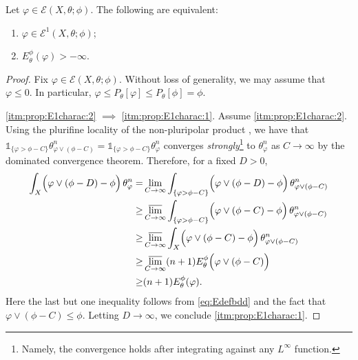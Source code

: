 \begin{proposition}\label{prop:E1charac}
    Let $\varphi\in \mathcal{E}(X,\theta;\phi)$. The following are equivalent:
    \begin{enumerate}
        \item\label{itm:prop:E1charac:1} $\varphi\in \mathcal{E}^1(X,\theta;\phi)$;
        \item\label{itm:prop:E1charac:2} $E^{\phi}_{\theta}(\varphi)>-\infty$.
    \end{enumerate}
\end{proposition}
\begin{proof}
    Fix $\varphi\in \mathcal{E}(X,\theta;\phi)$. Without loss of generality, we may assume that $\varphi\leq 0$. In particular, $\varphi\leq P_{\theta}[\varphi]\leq P_{\theta}[\phi]=\phi$.

    \ref{itm:prop:E1charac:2} $\implies$ \ref{itm:prop:E1charac:1}.
    Assume \ref{itm:prop:E1charac:2}. Using the plurifine locality of the non-pluripolar product , we have that $\mathds{1}_{\{\varphi>\phi-C\}} \theta_{\varphi\lor (\phi-C)}^n=\mathds{1}_{\{\varphi>\phi-C\}} \theta_{\varphi}^n$ converges \emph{strongly}\footnote{Namely, the convergence holds after integrating against any $L^{\infty}$ function.} to $\theta_{\varphi}^n$ as $C\to \infty$ by the dominated convergence theorem. Therefore, for a fixed $D>0$,
    \[
    \begin{aligned}
    \int_X \Bigl( \varphi\lor (\phi-D)-\phi \Bigr)\,\theta_{\varphi}^n=&\lim_{C\to\infty} \int_{\{\varphi>\phi-C\} } \Bigl( \varphi\lor (\phi-D)-\phi \Bigr)\,\theta_{\varphi\lor (\phi-C)}^n\\
    \geq & \varlimsup_{C\to\infty} \int_{\{\varphi>\phi-C\} } \Bigl( \varphi\lor (\phi-C)-\phi \Bigr)\,\theta_{\varphi\lor (\phi-C)}^n\\
    \geq & \varlimsup_{C\to\infty} \int_X \Bigl( \varphi\lor (\phi-C)-\phi \Bigr)\,\theta_{\varphi\lor (\phi-C)}^n\\
    \geq & \varlimsup_{C\to\infty} (n+1)E_{\theta}^{\phi}\Bigl(\varphi \lor (\phi-C) \Bigr)\\
    \geq & (n+1)E_{\theta}^{\phi}(\varphi).
    \end{aligned}
    \]
    Here the last but one inequality follows from \eqref{eq:Edefbdd} and the fact that $\varphi\lor (\phi-C)\leq \phi$.
    Letting $D\to\infty$, we conclude \ref{itm:prop:E1charac:1}.


\end{proof}
